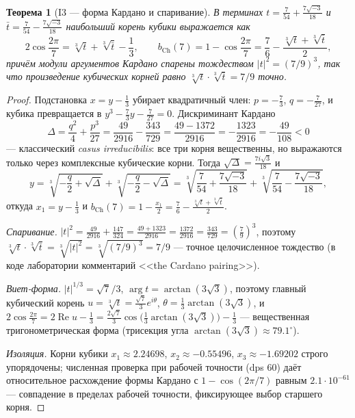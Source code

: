 \documentclass[11pt,a4paper]{article}
\theoremstyle{plain}
\newtheorem{theorem}{Теорема}
\theoremstyle{definition}
\theoremstyle{remark}
\newcommand{\re}{\operatorname{Re}}
\begin{document}
\begin{theorem}[I3 --- форма Кардано и спаривание]\label{th:I3}
В терминах $t=\frac{7}{54}+\frac{7\sqrt{-3}}{18}$ и
$\bar t=\frac{7}{54}-\frac{7\sqrt{-3}}{18}$ наибольший корень
кубики выражается как
\[
  2\cos\frac{2\pi}{7}=\sqrt[3]{t}+\sqrt[3]{\bar t}-\frac13,
  \qquad
  b_{\mathrm{Ch}}(7)=1-\cos\frac{2\pi}{7}
  =\frac76-\frac{\sqrt[3]{t}+\sqrt[3]{\bar t}}{2},
\]
причём модули аргументов Кардано спарены тождеством
$|t|^2=(7/9)^3$, так что произведение кубических корней равно
$\sqrt[3]{t}\cdot\sqrt[3]{\bar t}=7/9$ точно.
\end{theorem}

\begin{proof}
Подстановка $x=y-\frac13$ убирает квадратичный член:
$p=-\frac73$, $q=-\frac{7}{27}$, и кубика превращается в
$y^3-\frac73y-\frac7{27}=0$. Дискриминант Кардано
\[
  \Delta=\frac{q^2}{4}+\frac{p^3}{27}
  =\frac{49}{2916}-\frac{343}{729}
  =\frac{49-1372}{2916}=-\frac{1323}{2916}=-\frac{49}{108}<0
\]
--- классический \emph{casus irreducibilis}: все три корня
вещественны, но выражаются только через комплексные кубические
корни. Тогда $\sqrt{\Delta}=\frac{7i\sqrt3}{18}$ и
\[
  y=\sqrt[3]{-\frac q2+\sqrt\Delta}+\sqrt[3]{-\frac q2-\sqrt\Delta}
  =\sqrt[3]{\frac{7}{54}+\frac{7\sqrt{-3}}{18}}
  +\sqrt[3]{\frac{7}{54}-\frac{7\sqrt{-3}}{18}},
\]
откуда $x_1=y-\frac13$ и $b_{\mathrm{Ch}}(7)=1-\frac{x_1}{2}
=\frac76-\frac{\sqrt[3]{t}+\sqrt[3]{\bar t}}{2}$.

\emph{Спаривание.} $|t|^2=\frac{49}{2916}+\frac{147}{324}
=\frac{49+1323}{2916}=\frac{1372}{2916}=\frac{343}{729}=\left(\frac79\right)^3$,
поэтому $\sqrt[3]{t}\cdot\sqrt[3]{\bar t}=\sqrt[3]{|t|^2}
=\sqrt[3]{(7/9)^3}=7/9$ --- точное целочисленное тождество
(в коде лаборатории комментарий <<the Cardano pairing>>).

\emph{Виет-форма.} $|t|^{1/3}=\sqrt{7}/3$,
$\arg t=\arctan(3\sqrt3)$, поэтому главный кубический корень
$u=\sqrt[3]{t}=\frac{\sqrt7}{3}e^{i\theta}$,
$\theta=\frac13\arctan(3\sqrt3)$, и
$2\cos\frac{2\pi}{7}=2\re u-\frac13
=\frac{2\sqrt7}{3}\cos\!\Big(\frac13\arctan(3\sqrt3)\Big)-\frac13$
--- вещественная тригонометрическая форма (трисекция угла
$\arctan(3\sqrt3)\approx79.1^\circ$).

\emph{Изоляция.} Корни кубики $x_1\approx2.24698$,
$x_2\approx-0.55496$, $x_3\approx-1.69202$ строго упорядочены;
численная проверка при рабочей точности (dps 60) даёт
относительное расхождение формы Кардано с $1-\cos(2\pi/7)$
равным $2.1\cdot10^{-61}$ --- совпадение в пределах рабочей
точности, фиксирующее выбор старшего корня.
\end{proof}
\end{document}
